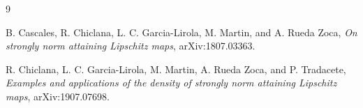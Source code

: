 \documentclass[11pt]{article}
\begin{document}
\begin{thebibliography}{9}

B. Cascales, R. Chiclana, L. C. Garcia-Lirola, M. Martin, and
A. Rueda Zoca,
\emph{On strongly norm attaining Lipschitz maps}, arXiv:1807.03363.

R. Chiclana, L. C. Garcia-Lirola, M. Martin, A. Rueda Zoca, and
P. Tradacete,
\emph{Examples and applications of the density of strongly norm attaining
Lipschitz maps}, arXiv:1907.07698.

\end{thebibliography}
\end{document}
